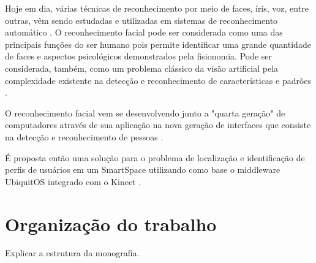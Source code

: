 Hoje em dia, várias técnicas de reconhecimento por meio de faces, íris, voz, entre outras, vêm sendo estudadas e utilizadas em sistemas de reconhecimento automático \cite{bolle}. O reconhecimento facial pode ser considerada como uma das principais funções do ser humano pois permite identificar uma grande quantidade de faces e aspectos psicológicos demonstrados pela fisionomia. Pode ser considerada, também, como um problema clássico da visão artificial pela complexidade existente na detecção e reconhecimento de características e padrões \cite{saocarlos}.

O reconhecimento facial vem se desenvolvendo junto a "quarta geração" de computadores através de sua aplicação na nova geração de interfaces que consiste na detecção e reconhecimento de pessoas \cite{saocarlos}.

É proposta então uma solução para o problema de localização e identificação de perfis de usuários em um SmartSpace utilizando como base o middleware UbiquitOS \cite{alegomes} integrado com o Kinect \cite{kinecturl}.

\section{Organização do trabalho}

	Explicar a estrutura da monografia.